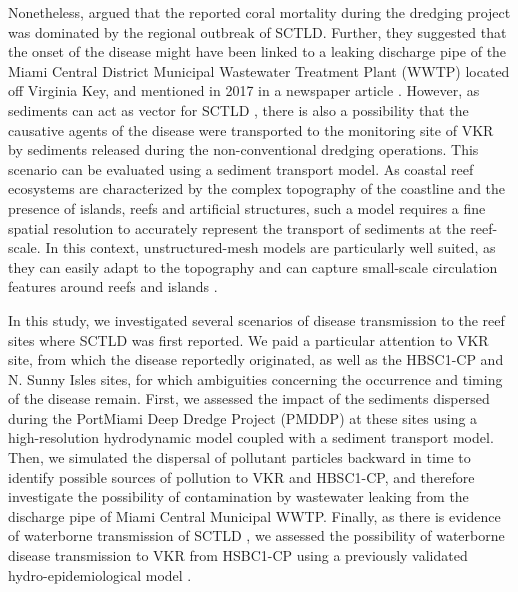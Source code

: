 \documentclass[preprint,12pt,authoryear]{elsarticle}
\begin{document}
Nonetheless, \cite{gintert2019regional} argued that the reported coral mortality during the dredging project was dominated by the regional outbreak of SCTLD. Further, they suggested that the onset of the disease might have been linked to a leaking discharge pipe of the Miami Central District Municipal Wastewater Treatment Plant (WWTP) located off Virginia Key, and mentioned in 2017 in a newspaper article \citep{staletovich2017}. However, as sediments can act as vector for SCTLD \citep{studivan2022reef}, there is also a possibility that the causative agents of the disease were transported to the monitoring site of VKR by sediments released during the non-conventional dredging operations. This scenario can be evaluated using a sediment transport model. As coastal reef ecosystems are characterized by the complex topography of the coastline and the presence of islands, reefs and artificial structures, such a model requires a fine spatial resolution to accurately represent the transport of sediments at the reef-scale. In this context, unstructured-mesh models are particularly well suited, as they can easily adapt to the topography \citep{fringer2019future} and can capture small-scale circulation features around reefs and islands \citep{lambrechts2008multi}.

In this study, we investigated several scenarios of disease transmission to the reef sites where SCTLD was first reported. We paid a particular attention to VKR site, from which the disease reportedly originated, as well as the HBSC1-CP and N. Sunny Isles sites, for which ambiguities concerning the occurrence and timing of the disease remain. First, we assessed the impact of the sediments dispersed during the PortMiami Deep Dredge Project (PMDDP) at these sites using a high-resolution hydrodynamic model coupled with a sediment transport model. Then, we simulated the dispersal of pollutant particles backward in time to identify possible sources of pollution to VKR and HBSC1-CP, and therefore investigate the possibility of contamination by wastewater leaking from the discharge pipe of Miami Central Municipal WWTP. Finally, as there is evidence of waterborne transmission of SCTLD \citep{aeby2019pathogenesis,eaton2021measuring, meiling2021variable}, we assessed the possibility of waterborne disease transmission to VKR from HSBC1-CP using a previously validated hydro-epidemiological model \citep{dobbelaere2022connecting}.
\end{document}
